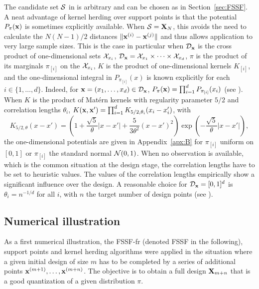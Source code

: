 The candidate set $\mathcal{S}$ in  is arbitrary and can be chosen as in Section~\ref{sec:FSSF}. 
A neat advantage of kernel herding over support points is that the potential $P_{\pi}({\bf x})$ is sometimes explicitly available. 
When $\mathcal{S}={\bf X}_N$, this avoids the need to calculate the $N(N-1)/2$ distances $\|{\bf x}^{(i)}-{\bf x}^{(j)}\|$ and thus allows application to very large sample sizes. 
This is the case in particular when $\mathcal{D}_{\bf x}$ is the cross product of one-dimensional sets $\mathcal{X}_{x_i}$, $\mathcal{D}_{\bf x}=\mathcal{X}_{x_1}\times\cdots\times\mathcal{X}_{x_d}$, $\pi$ is the product of 
its marginals
$\pi_{[i]}$ on the $\mathcal{X}_{x_i}$, $K$ is the product of one-dimensional kernels $K_{[i]}$, and the one-dimensional integral in $P_{\pi_{[i]}}(x)$ is known explicitly for each $i\in\{1,\ldots,d\}$. 
Indeed, for ${\bf x}=(x_1,\ldots,x_d)\in\mathcal{D}_{\bf x}$, $P_{\pi}({\bf x})=\prod_{i=1}^d P_{\pi_{[i]}}(x_i)$ (see \citealp{pronzato_zhigljavsky_2020}). 
When $K$ is the product of Mat\'ern kernels with regularity parameter $5/2$ and correlation lengths $\theta_i$, $K({\bf x},{\bf x}') = \prod_{i=1}^{d} K_{5/2,\theta_{i}}(x_{i}-x'_i)$, with
\begin{equation}\label{eq:Matern5/2}
K_{5/2,\theta}(x-x')
=
\left(1 + \frac{\sqrt{5}}{\theta} |x - x'| + \frac{5}{3 \theta^2} (x - x')^2 \right)
\exp \left( - \frac{\sqrt{5}}{\theta} |x - x'| \right),
\end{equation}
the one-dimensional potentials are given in Appendix~\ref{apx:B} for $\pi_{[i]}$ uniform on $[0,1]$ or $\pi_{[i]}$ the standard normal ${\mathcal{N}}(0,1)$. 
When no observation is available, which is the common situation at the design stage, the correlation lengths have to be set to heuristic values. 
The values of the correlation lengths empirically show a significant influence over the design. 
A reasonable choice for $\mathcal{D}_{\bf x}=[0,1]^d$ is $\theta_i = n^{-1/d}$ for all $i$, with $n$ the target number of design points (see \citealp{pronzato_zhigljavsky_2020}). 

\subsection{Numerical illustration}\label{sec:numerical-1}

As a first numerical illustration, the FSSF-fr (denoted FSSF in the following), support points and kernel herding algorithms were applied in the situation where a given initial design of size $m$ has to be completed by a series of additional points ${\bf x}^{(m+1)},\ldots,{\bf x}^{(m+n)}$. 
The objective is to obtain a full design ${\bf X}_{m+n}$ that is a good quantization of a given distribution $\pi$. 

